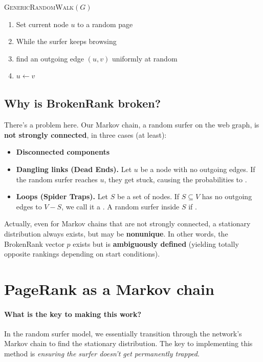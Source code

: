 \documentclass[11pt]{exam}
\begin{document}
\textsc{GenericRandomWalk}$(G)$
\begin{enumerate}
    \item Set current node $u$ to a random page
    \item While the surfer keeps browsing
    \item \;\;\; find an outgoing edge $(u,v)$ uniformly at random
    \item \;\;\; $u \leftarrow v$
\end{enumerate}

\newpage
\subsection{Why is BrokenRank broken?}
There's a problem here. Our Markov chain, a random surfer on the web graph, is \textbf{not strongly connected}, in three cases (at least):
\begin{itemize}
    \item \textbf{Disconnected components}
    \item \textbf{Dangling links (Dead Ends).} Let $u$ be a node with no outgoing edges. If the random surfer reaches $u$, they get stuck, causing the probabilities to .
    \item \textbf{Loops (Spider Traps).} Let $S$ be a set of nodes. If $S \subseteq V$ has no outgoing edges to $V-S$, we call it a . A random surfer  inside $S$ if .
\end{itemize}

Actually, even for Markov chains that are not strongly connected, a stationary distribution always exists, but may be \textbf{nonunique}. In other words, the BrokenRank vector $p$ exists but is \textbf{ambiguously defined} (yielding totally opposite rankings depending on start conditions).

\newpage
\section{PageRank as a Markov chain}
\paragraph{What is the key to making this work?}
In the random surfer model, we essentially transition through the network's Markov chain to find the stationary distribution. The key to implementing this method is \emph{ensuring the surfer doesn't get permanently trapped}.
\end{document}
